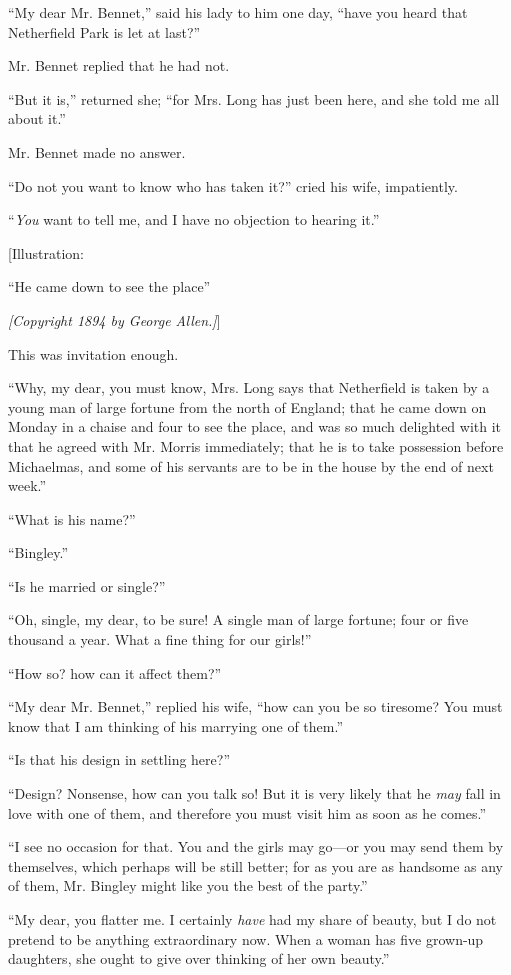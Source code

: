 \documentclass[12pt]{book}
\begin{document}
``My dear Mr. Bennet,'' said his lady to him one day, ``have you heard that Netherfield Park is let at last?''

Mr. Bennet replied that he had not.

``But it is,'' returned she; ``for Mrs. Long has just been here, and she told me all about it.''

Mr. Bennet made no answer.

``Do not you want to know who has taken it?'' cried his wife, impatiently.

``\textit{You} want to tell me, and I have no objection to hearing it.''

[Illustration:

``He came down to see the place''

\emph{[\textit{Copyright 1894 by George Allen.}]}]

This was invitation enough.

``Why, my dear, you must know, Mrs. Long says that Netherfield is taken by a young man of large fortune from the north of England; that he came down on Monday in a chaise and four to see the place, and was so much delighted with it that he agreed with Mr. Morris immediately; that he is to take possession before Michaelmas, and some of his servants are to be in the house by the end of next week.''

``What is his name?''

``Bingley.''

``Is he married or single?''

``Oh, single, my dear, to be sure! A single man of large fortune; four or five thousand a year. What a fine thing for our girls!''

``How so? how can it affect them?''

``My dear Mr. Bennet,'' replied his wife, ``how can you be so tiresome? You must know that I am thinking of his marrying one of them.''

``Is that his design in settling here?''

``Design? Nonsense, how can you talk so! But it is very likely that he \textit{may} fall in love with one of them, and therefore you must visit him as soon as he comes.''

``I see no occasion for that. You and the girls may go---or you may send them by themselves, which perhaps will be still better; for as you are as handsome as any of them, Mr. Bingley might like you the best of the party.''

``My dear, you flatter me. I certainly \textit{have} had my share of beauty, but I do not pretend to be anything extraordinary now. When a woman has five grown-up daughters, she ought to give over thinking of her own beauty.''
\end{document}
